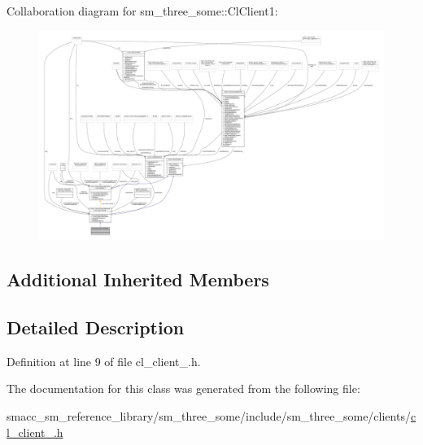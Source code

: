 Collaboration diagram for sm\+\_\+three\+\_\+some\+:\+:Cl\+Client1\+:
\nopagebreak
\begin{figure}[H]
\begin{center}
\leavevmode
\includegraphics[width=350pt]{classsm__three__some_1_1ClClient1__coll__graph}
\end{center}
\end{figure}
\subsection*{Additional Inherited Members}


\subsection{Detailed Description}


Definition at line 9 of file cl\+\_\+client\+\_.\+h.



The documentation for this class was generated from the following file\+:\begin{DoxyCompactItemize}
\item 
smacc\+\_\+sm\+\_\+reference\+\_\+library/sm\+\_\+three\+\_\+some/include/sm\+\_\+three\+\_\+some/clients/\hyperlink{cl__client__1_8h}{cl\+\_\+client\+\_.\+h}\end{DoxyCompactItemize}
